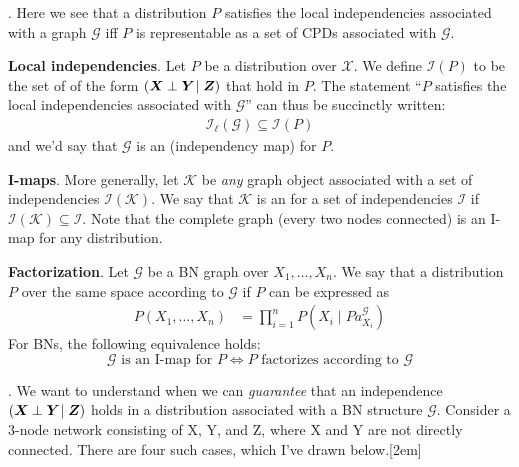 \documentclass[11pt]{article}
\begin{document}
\myspace
\p {}. Here we see that a distribution $P$ satisfies the local independencies associated with a graph $\mathcal G$ iff $P$ is representable as a set of CPDs associated with $\mathcal G$.  
\begin{compactitem}
	\item \textbf{Local independencies}. Let $P$ be a distribution over $\mathcal{X}$. We define $\mathcal I (P)$ to be the set of  of the form $(\bm{X}_{} \perp \bm{Y}_{} \mid \bm{Z}_{})$ that hold in $P$. The statement ``$P$ satisfies the local independencies associated with $\mathcal G$'' can thus be succinctly written:
	\begin{align}
		\mathcal{I}_{\ell}(\mathcal G) \subseteq \mathcal{I}(P)
	\end{align}
	and we'd say that $\mathcal G$ is an  (independency map) for $P$. 
	
	\item \textbf{I-maps}. More generally, let $\mathcal K$ be \textit{any} graph object associated with a set of independencies $\mathcal I(\mathcal K)$. We say that $\mathcal K$ is an  for a set of independencies $\mathcal I$ if $\mathcal I(\mathcal K) \subseteq \mathcal I$. Note that the complete graph (every two nodes connected) is an I-map for any distribution. 
	
	\item \textbf{Factorization}. Let $\mathcal G$ be a BN graph over $X_1, \ldots, X_n$. We say that a distribution $P$ over the same space  according to $\mathcal G$ if $P$ can be expressed as 
	\begin{align}
		P(X_1, \ldots, X_n) &= \prod_{i = 1}^n P(X_i \mid Pa_{X_i}^{\mathcal G})
	\end{align}
	For BNs, the following equivalence holds: 
	$$
		\mathcal G \text{ is an I-map for } P \iff P \text{ factorizes according to } \mathcal G
	$$
	
\end{compactitem}

\myspace
\p {}. We want to understand when we can \textit{guarantee} that an independence $(\bm{X}_{} \perp \bm{Y}_{} \mid \bm{Z}_{})$ holds in a distribution associated with a BN structure $\mathcal G$. Consider a 3-node network consisting of X, Y, and Z, where X and Y are not directly connected. There are four such cases, which I've drawn below.[2em]
\end{document}

